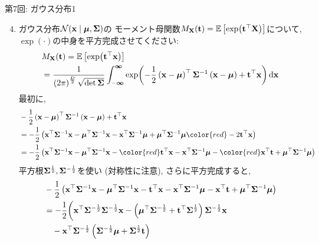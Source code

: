 \documentclass[dvipdfmx,notheorems,t]{beamer}
\begin{document}
\begin{frame}{第7回: ガウス分布1}
\begin{enumerate}
  \setcounter{enumi}{3}
  \item ガウス分布$\mathcal{N}(\vb{x} \mid \vb*{\mu}, \vb{\Sigma})$の
  モーメント母関数$M_{\vb{X}}(\vb{t}) = \operatorname{\mathbb{E}} \left[ \exp(\vb{t}^\top \vb{X}) \right]$について,
  $\exp(\cdot)$の中身を平方完成させてください:
  \begin{align*}
    & M_{\vb{X}}(\vb{t}) = \operatorname{\mathbb{E}} \left[ \exp(\vb{t}^\top \vb{x}) \right] \\
    &= \frac{1}{\left( 2\pi \right)^\frac{D}{2} \sqrt{\det \vb{\Sigma}}}
      \int_{-\boldsymbol{\infty}}^{\boldsymbol{\infty}}
      \exp(-\frac{1}{2} \left( \vb{x} - \vb*{\mu} \right)^\top \vb{\Sigma}^{-1}
        \left( \vb{x} - \vb*{\mu} \right) + \vb{t}^\top \vb{x}) \dd{\vb{x}}
  \end{align*}
  最初に,
  {\small \begin{align*}
    & -\frac{1}{2} \left( \vb{x} - \vb*{\mu} \right)^\top \vb{\Sigma}^{-1}
      \left( \vb{x} - \vb*{\mu} \right) + \vb{t}^\top \vb{x} \\
    &= -\frac{1}{2} \left( \vb{x}^\top \vb{\Sigma}^{-1} \vb{x}
      - \vb*{\mu}^\top \vb{\Sigma}^{-1} \vb{x}
      - \vb{x}^\top \vb{\Sigma}^{-1} \vb*{\mu}
      + \vb*{\mu}^\top \vb{\Sigma}^{-1} \vb*{\mu} {\color{red} - 2 \vb{t}^\top \vb{x}} \right) \\
    &= -\frac{1}{2} \left( \vb{x}^\top \vb{\Sigma}^{-1} \vb{x}
      - \vb*{\mu}^\top \vb{\Sigma}^{-1} \vb{x} - {\color{red} \vb{t}^\top \vb{x}}
      - \vb{x}^\top \vb{\Sigma}^{-1} \vb*{\mu} - {\color{red} \vb{x}^\top \vb{t}}
      + \vb*{\mu}^\top \vb{\Sigma}^{-1} \vb*{\mu} \right)
  \end{align*}}
  平方根$\vb{\Sigma}^{\frac{1}{2}}, \vb{\Sigma}^{-\frac{1}{2}}$を使い (対称性に注意), さらに平方完成すると,
  {\small \begin{align*}
    & -\frac{1}{2} \left( \vb{x}^\top \vb{\Sigma}^{-1} \vb{x}
      - \vb*{\mu}^\top \vb{\Sigma}^{-1} \vb{x} - \vb{t}^\top \vb{x}
      - \vb{x}^\top \vb{\Sigma}^{-1} \vb*{\mu} - \vb{x}^\top \vb{t}
      + \vb*{\mu}^\top \vb{\Sigma}^{-1} \vb*{\mu} \right) \\
    &= -\frac{1}{2} \bigg( \vb{x}^\top \vb{\Sigma}^{-\frac{1}{2}} \vb{\Sigma}^{-\frac{1}{2}} \vb{x}
      - \left( \vb*{\mu}^\top \vb{\Sigma}^{-\frac{1}{2}} + \vb{t}^\top \vb{\Sigma}^{\frac{1}{2}} \right)
        \vb{\Sigma}^{-\frac{1}{2}} \vb{x} \\
    & \quad - \vb{x}^\top \vb{\Sigma}^{-\frac{1}{2}}
        \left( \vb{\Sigma}^{-\frac{1}{2}} \vb*{\mu} + \vb{\Sigma}^{\frac{1}{2}} \vb{t} \right)

\end{align*}}
\end{enumerate}
\end{frame}
\end{document}
